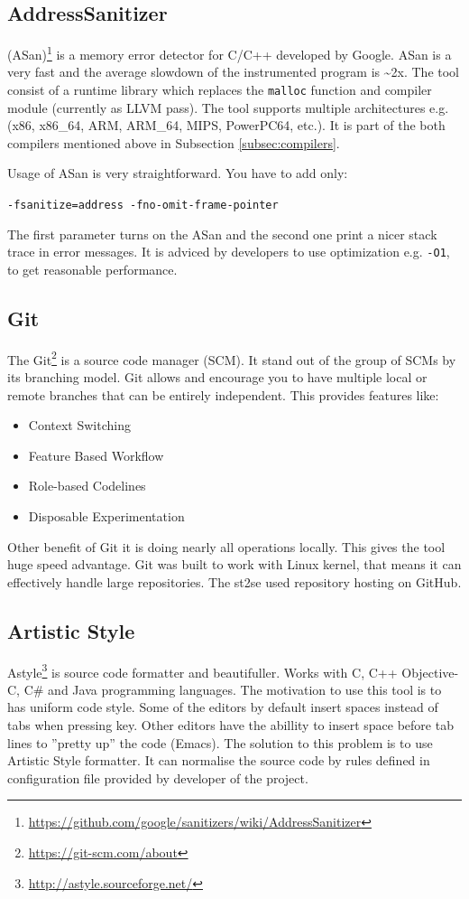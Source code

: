 \subsection{AddressSanitizer}
(ASan)\footnote{\url{https://github.com/google/sanitizers/wiki/AddressSanitizer}} is a memory error detector for C/C++ developed by Google.
ASan is a very fast and the average slowdown of the instrumented program is \textasciitilde 2x.
The tool consist of a runtime library which replaces the \texttt{malloc} function and compiler module (currently as LLVM pass).
The tool supports multiple architectures e.g. (x86, x86\_64, ARM, ARM\_64, MIPS, PowerPC64, etc.).
It is part of the both compilers mentioned above in Subsection \ref{subsec:compilers}.

Usage of ASan is very straightforward. You have to add only:\\
\begin{center}
	\texttt{-fsanitize=address -fno-omit-frame-pointer}
\end{center}
The first parameter turns on the ASan and the second one print a nicer stack trace in error messages.
It is adviced by developers to use optimization e.g. \texttt{-O1}, to get reasonable performance.

\subsection{Git}
The Git\footnote{\url{https://git-scm.com/about}} is a source code manager (SCM). It stand out of the group of SCMs by its branching model.
Git allows and encourage you to have multiple local or remote branches that can be entirely independent.
This provides features like:
\begin{itemize}
	\item Context Switching
	\item Feature Based Workflow
	\item Role-based Codelines
	\item Disposable Experimentation
\end{itemize}
Other benefit of Git it is doing nearly all operations locally.
This gives the tool huge speed advantage.
Git was built to work with Linux kernel, that means it can effectively handle large repositories.
The st2se used repository hosting on GitHub.

\subsection{Artistic Style}
Astyle\footnote{\url{http://astyle.sourceforge.net/}} is  source code formatter and beautifuller.
Works with C, C++ Objective-C, C\# and Java programming languages.
The motivation to use this tool is to has uniform code style.
Some of the editors by default insert spaces instead of tabs when pressing key.
Other editors have the abillity to insert space before tab lines to ''pretty up'' the code (Emacs).
The solution to this problem is to use Artistic Style formatter.
It can normalise the source code by rules defined in configuration file provided by developer of the project.

